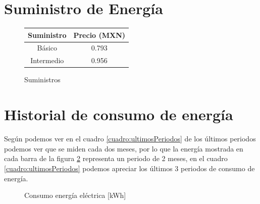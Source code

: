 \documentclass[]{article}
\begin{document}
	

\section{Suministro de Energía
}


\begin{figure}[h!]
	\centering
	\begin{tabular}[]{|c|c|}
		\hline
		 Suministro & Precio (MXN)\\
		 	\hline
		 Básico & 0.793 \\
		 Intermedio & 0.956 \\
		\hline
	\end{tabular}
	\label{cuadro:suministros}
	\caption{Suministros}
	
\end{figure}



\section{Historial de consumo de energía}

Según podemos ver en el cuadro \ref{cuadro:ultimosPeriodos} de los últimos periodos podemos ver que se miden cada dos meses, por lo que la energía mostrada en cada barra de la figura \ref{fig:grafConsumo} representa un periodo de 2 meses, en el cuadro \ref{cuadro:ultimosPeriodos} podemos apreciar los últimos 3 periodos de consumo de energía.\\



\begin{figure}[h!]
	\centering
{}
\caption{Consumo energía eléctrica [kWh]}
\label{fig:grafConsumo}
\end{figure}
\end{document}
